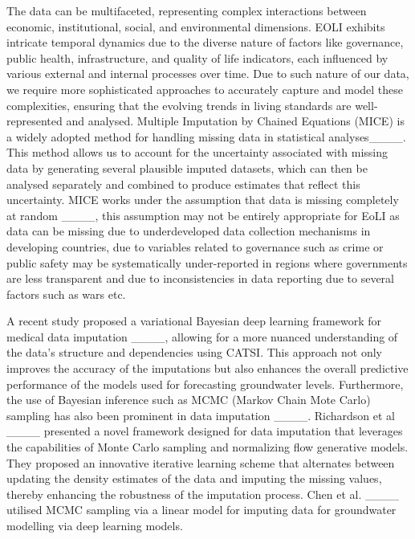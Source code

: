 The data can be multifaceted, representing complex interactions between economic, institutional, social, and environmental dimensions. EOLI exhibits intricate temporal dynamics due to the diverse nature of factors like governance, public health, infrastructure, and quality of life indicators, each influenced by various external and internal processes over time. Due to such nature of our data, we require more sophisticated approaches to accurately capture and model these complexities, ensuring that the evolving trends in living standards are well-represented and analysed. Multiple Imputation by Chained Equations (MICE) is a widely adopted method for handling missing data in statistical analyses____. This method allows us to account for the uncertainty associated with missing data by generating several plausible imputed datasets, which can then be analysed separately and combined to produce estimates that reflect this uncertainty.  MICE works under the assumption that data is missing completely at random ____, this assumption may not be entirely appropriate for EoLI as data can be missing due to underdeveloped data collection mechanisms in developing countries, due to variables related to governance such as crime or public safety may be systematically under-reported in regions where governments are less transparent and due to inconsistencies in data reporting due to several factors such as wars etc.    


 
A recent study proposed a variational Bayesian deep learning framework for medical data imputation ____, allowing for a more nuanced understanding of the data's structure and dependencies using CATSI. This approach not only improves the accuracy of the imputations but also enhances the overall predictive performance of the models used for forecasting groundwater levels. Furthermore, the use of Bayesian inference such as MCMC (Markov Chain Mote Carlo) sampling has also been prominent in data imputation ____. Richardson et al ____  presented a novel framework designed for data imputation that leverages the capabilities of Monte Carlo sampling and normalizing flow generative models. They proposed an innovative iterative learning scheme that alternates between updating the density estimates of the data and imputing the missing values, thereby enhancing the robustness of the imputation process. Chen et al.  ____  utilised MCMC sampling via a linear model for imputing data for groundwater modelling via deep learning models. 

